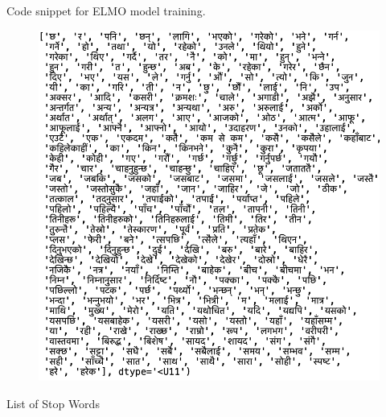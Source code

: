 \centering 
[B] Code snippet for ELMO model training.
\begin{figure}[H]
	\centering 
	\vspace{5pt}\includegraphics[width=15cm]{images/Stop_words.png}
\end{figure}
\centering 
[C] List of Stop Words
